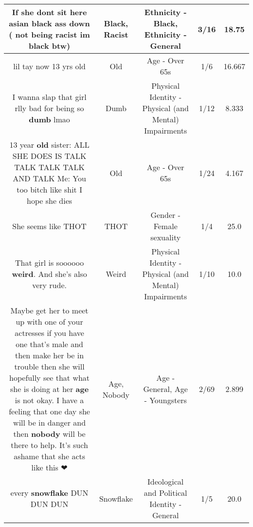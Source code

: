 \documentclass[11pt]{article}
\newlength\mylength
\begin{document}
\begin{center}
\begin{longtable}{|C{.65\mylength}|C{.30\mylength}|C{.12\mylength}|C{.12\mylength}|C{.12\mylength}|}
  \small If she dont sit here asian \textbf{black} ass down ( not being \textbf{racist} im \textbf{black} btw)\normalsize   & Black, Racist & Ethnicity - Black, Ethnicity - General & 3/16 & 18.75 \\  \hline
  \small lil tay now 13 yrs old\normalsize   & Old & Age - Over 65s & 1/6 & 16.667 \\  \hline
  \small I wanna slap that girl rlly bad for being so \textbf{dumb} lmao\normalsize   & Dumb & Physical Identity - Physical (and Mental) Impairments & 1/12 & 8.333 \\  \hline
  \small 13 year \textbf{old} sister: ALL SHE DOES IS TALK TALK TALK TALK AND TALK Me: You too bitch like shit I hope she dies\normalsize   & Old & Age - Over 65s & 1/24 & 4.167 \\  \hline
  \small She seems like THOT\normalsize   & THOT & Gender - Female sexuality & 1/4 & 25.0 \\  \hline
  \small That girl is soooooo \textbf{weird}. And she's also very rude.\normalsize   & Weird & Physical Identity - Physical (and Mental) Impairments & 1/10 & 10.0 \\  \hline
  \small Maybe get her to meet up with one of your actresses if you have one that's male and then make her be in trouble then she will hopefully see that what she is doing at her \textbf{age} is not okay. I have a feeling that one day she will be in danger and then \textbf{nobody} will be there to help. It's such ashame that she acts like this ❤\normalsize   & Age, Nobody & Age - General, Age - Youngsters & 2/69 & 2.899 \\  \hline
  \small every \textbf{snowflake} DUN DUN DUN\normalsize   & Snowflake &  Ideological and Political Identity - General & 1/5 & 20.0 \\  \hline

\end{longtable}
\end{center}
\end{document}
